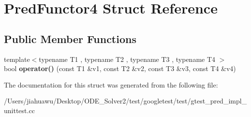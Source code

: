\hypertarget{struct_pred_functor4}{}\section{Pred\+Functor4 Struct Reference}
\label{struct_pred_functor4}
\subsection*{Public Member Functions}
\begin{DoxyCompactItemize}
\item 
\mbox{\label{struct_pred_functor4_a6cfb6ccd9a66bf93d9c43a49575e3869}} 
{\footnotesize template$<$typename T1 , typename T2 , typename T3 , typename T4 $>$ }\\bool {\bfseries operator()} (const T1 \&v1, const T2 \&v2, const T3 \&v3, const T4 \&v4)
\end{DoxyCompactItemize}


The documentation for this struct was generated from the following file\+:\begin{DoxyCompactItemize}
\item 
/\+Users/jiahuawu/\+Desktop/\+O\+D\+E\+\_\+\+Solver2/test/googletest/test/gtest\+\_\+pred\+\_\+impl\+\_\+unittest.\+cc\end{DoxyCompactItemize}
